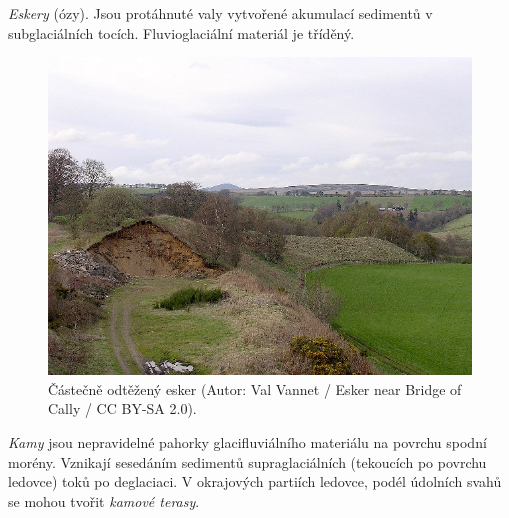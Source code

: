 \emph{Eskery} (ózy). Jsou protáhnuté valy vytvořené akumulací sedimentů v subglaciálních tocích. Fluvioglaciální materiál je tříděný.

\begin{figure}
	\centering
	\includegraphics[width=1\linewidth]{obrazky/glac/esker}
	\caption{Částečně odtěžený esker (Autor: Val Vannet / Esker near Bridge of Cally / CC BY-SA 2.0).}
	\label{fig:esker}
\end{figure}

\emph{Kamy} jsou nepravidelné pahorky glacifluviálního materiálu na povrchu spodní morény. Vznikají sesedáním sedimentů supraglaciálních (tekoucích po povrchu ledovce) toků po deglaciaci. V okrajových partiích ledovce, podél údolních svahů se mohou tvořit \emph{kamové terasy}.

%		
%
%	
